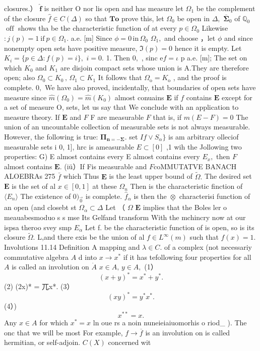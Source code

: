 closures.） $\hat{\boldsymbol{f}}$ is neither O nor lis open and has measure let $\Omega_{1}$ be the complement of the closure ${\hat{f}}\in C(\Delta)$ so that $\mathbf{To}$ prove this, let $\Omega_{0}$ be open in $\Delta,$ ${\overline{{\boldsymbol{\Sigma}}}}_{0}$ of $\mathbb{Q}_{0}$ $\operatorname{off}$ shows tha be the characteristic function of at every $p\in\Omega_{0}$ Likewise $:j\left(p\right)=1{\mathrm{~if~}}p\in\Omega_{1}.$ a.e. [m] Since $\phi=0\,\mathrm{in}\,\Omega_{0}$ $\Omega_{1},$ and choose ，let $\phi$ and since nonempty open sets have positive measure, $\textstyle{\mathfrak{I}}\left(p\right)=0$ hence it is empty. Let $K_{i}=\{p\in\Delta\colon f(p)=i\},$ $i=0.$ 1. Then $0,$ , sinc $\mathrm{e}f=\iota$ p a.e. [m]; The set on which $K_{0}$ and $K_{1}$ are disjoin compact sets whose union is A.They are therefore open; also $\Omega_{0}\subset K_{0}\,,\,\Omega_{1}\subset K_{1}$ It follows that $\Omega_{\mathrm{o}}=K_{\mathrm{o}}$ , and the proof is complete. $0,$ We have also proved, incidentally, that boundaries of open sets have measure since $\hat{m}(\Omega_{0})=\hat{m}(K_{0})$ almost conuains ${\boldsymbol{E}}$ if ${\boldsymbol{\mathit{f}}}$ contains ${\boldsymbol{E}}$ except for a set of measure O, sets, let us say that We conclude with an application to measure theory. If ${\boldsymbol{E}}$ and ${\mathbf{}}F$ F are measurable ${\mathbf{}}F$ that is, if $m(E-F)=0$ The union of an uncountable collection of measurable sets is not always measurable. However, the following is true: $\mathbf{\Pi}_{\mathbf{n}=-\mathbf{\Sigma}}.$ set $I f\vee S_{\alpha}\}$ is am arbitrary olleciof measurable sets i 0, 1], hrc is ameasurable $E\subset[0]$ ,1 wih the Jollowing two properties: G) E almost contains every E almost contains every $E_{x},$ then ${\mathbf{}}F$ almost contains ${\boldsymbol{E}}.$ (iü）If Fis measurable and ${\mathbf{}}F$coMMUTATVE BANACH ALOEBRAs 275 $\bar{f}$ which Thus $\boldsymbol{E}$ is the least upper bound of ${\widetilde\Omega}.$ The desired set $\boldsymbol{E}$ is the set of al $x\in[0,1]$ at these $\scriptstyle\Omega_{n}$ Then is the characteristic finction of $\langle E_{n}\rangle$ The existence of $0)_{\vec{0}}$ is complete. ${\hat{f}}_{\alpha}$ is then the $\underline{{\otimes}}$ characterisi function of an open (and closebt st $\Omega_{\alpha}\subset\Delta$ Let （ $\Omega$ ${\boldsymbol{E}}$ implies that the Boles ler o meauabesmoduo s s mse Its Gelfand transform With the mchincry now at our ispsa theroo svey smp $E_{\alpha}$ Let f. be the characteristic function of is open, so is its closure ${\widetilde\Omega}.$ L,and there exis be the union of al $f\in L^{\infty}(m)$ such that $f(x)=1.$ Involutions 11.14 Definition A mapping and $\lambda\in C.$ of a complex (not necessariy commutative algebra $\textstyle A$ d into $x\to x^{*}$ if it has tefollowing four properties for all $\textstyle A$ is called an involution on $\scriptstyle{\dot{A}}$ $x\in A,\,y\in A,$ (1） $$ (x+y)^{\ast}=x^{\ast}+y^{\ast}. $$ (2) (2x)* = 兀x*. (3） $$ (x y)^{*}=y^{*}x^{*}. $$ (4）) $$ x^{**}=x. $$ Any $x\in A$ for which $x^{*}=x$ ln oue rs a noin nuneieiaiuomorhis o riod_ ). The onc that we will be most For example, $f\to{\overline{{f}}}$ is an involution on is called hermitian, or self-adjoin. $C(X)$ concerned wit 